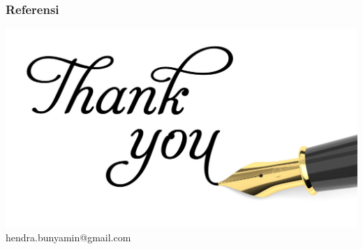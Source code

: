\documentclass{beamer}
\theoremstyle{mystyle}
\begin{document}
%
\begin{frame}[allowframebreaks]
  \frametitle<presentation>{\textbf{Referensi}}
    {\footnotesize
    
    
    }    
\end{frame}



\begin{frame}[plain]
		\centering\includegraphics[scale=1]{thank-you}	
		hendra.bunyamin@gmail.com
\end{frame}
\end{document}
